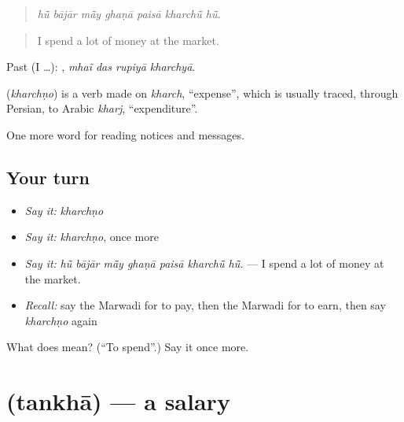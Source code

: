 \begin{quote}
      
\end{quote}

\begin{quote}
\emph{hū̃ bājār mā̃y ghaṇā paisā kharchū̃ hū̃.}
\end{quote}

\begin{quote}
I spend a lot of money at the market.
\end{quote}

Past (I …):    , \emph{mhaĩ das rupiyā kharchyā}.

\begin{cousinweb}
\textbf{} (\emph{kharchṇo}) is a verb made on \emph{kharch}, \textquotedblleft{}expense\textquotedblright{}, which is usually traced, through Persian, to Arabic \emph{kharj}, \textquotedblleft{}expenditure\textquotedblright{}.
\end{cousinweb}

\begin{grammarlens}[title={What you've built}]
One more word for reading notices and messages.
\end{grammarlens}

\subsection*{Your turn}
\begin{itemize}
\raggedright
  \item \emph{Say it:} \emph{kharchṇo}
  \item \emph{Say it:} \emph{kharchṇo}, once more
  \item \emph{Say it:} \emph{hū̃ bājār mā̃y ghaṇā paisā kharchū̃ hū̃.} — I spend a lot of money at the market.
  \item \emph{Recall:} say the Marwadi for to pay, then the Marwadi for to earn, then say \emph{kharchṇo} again
\end{itemize}

\begin{tcolorbox}[breakable,colback=teal!4,colframe=teal!35!black,title={Before you move on}]
What does  mean? (\textquotedblleft{}To spend\textquotedblright{}.) Say it once more.
\end{tcolorbox}
\section[\texorpdfstring{\mw{तनखा} (tankhā)}{तनखा (tankhā)}]{ (tankhā) — a salary}

